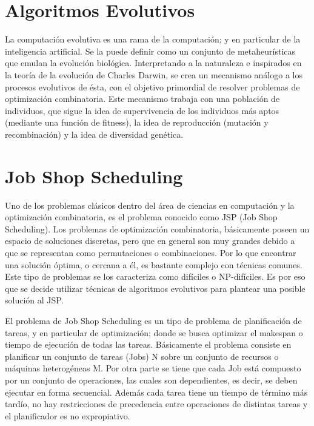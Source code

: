 \documentclass[journal]{IEEEtran}
\begin{document}
\section{Algoritmos Evolutivos}
La computación evolutiva es una rama de la computación; y en particular de la inteligencia artificial. Se la puede definir como un conjunto de metaheurísticas que emulan la evolución biológica. Interpretando a la naturaleza e inspirados en la teoría de la evolución de Charles Darwin, se crea un mecanismo análogo a los procesos evolutivos de ésta, con el objetivo primordial de resolver problemas de optimización combinatoria. 
	Este mecanismo trabaja con una población de individuos, que sigue la idea de supervivencia de los individuos más aptos (mediante una función de fitness), la idea de reproducción (mutación y recombinación) y la idea de diversidad genética.


\section{Job Shop Scheduling}
Uno de los problemas clásicos dentro del área de ciencias en computación y la optimización combinatoria, es el problema conocido como JSP (Job Shop Scheduling). 	Los problemas de optimización combinatoria, básicamente poseen un espacio de soluciones discretas, pero que en general son muy grandes debido a que se representan como permutaciones o combinaciones. Por lo que encontrar una solución óptima, o cercana a él, es bastante complejo con técnicas comunes. 
	Este tipo de problemas se los caracteriza como difíciles o NP-difíciles. Es por eso que se decide utilizar técnicas de algoritmos evolutivos para plantear una posible solución al JSP.

	El problema de Job Shop Scheduling  es un tipo de problema de planificación de tareas, y en particular de optimización; donde se busca optimizar el makespan o tiempo de ejecución de todas las tareas. 
	Básicamente el problema consiste en planificar un conjunto de tareas (Jobs) N sobre un conjunto de recursos o máquinas heterogéneas M. 
	Por otra parte se tiene que cada Job está compuesto por un conjunto de operaciones, las cuales son dependientes, es decir, se deben ejecutar en forma secuencial. 
	Además cada tarea tiene un tiempo de término más tardío, no hay restricciones de precedencia entre operaciones de distintas tareas y el planificador es no expropiativo.
	
\end{document}
